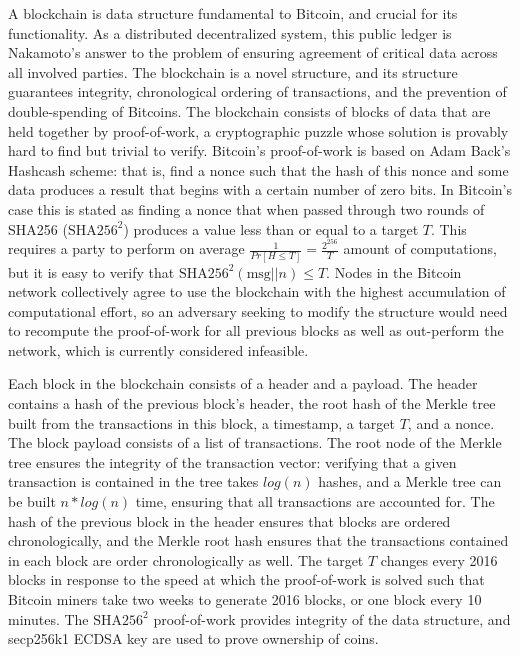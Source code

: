 A blockchain is data structure fundamental to Bitcoin, and crucial for its functionality. As a distributed decentralized system, this public ledger is Nakamoto's answer to the problem of ensuring agreement of critical data across all involved parties. The blockchain is a novel structure, and its structure guarantees integrity, chronological ordering of transactions, and the prevention of double-spending of Bitcoins. The blockchain consists of blocks of data that are held together by proof-of-work, a cryptographic puzzle whose solution is provably hard to find but trivial to verify. Bitcoin's proof-of-work is based on Adam Back's Hashcash scheme: that is, find a nonce such that the hash of this nonce and some data produces a result that begins with a certain number of zero bits. In Bitcoin's case this is stated as finding a nonce that when passed through two rounds of SHA256 ($ \textrm{SHA}256^{{2}} $) produces a value less than or equal to a target $ T $. This requires a party to perform on average $ \frac{1}{Pr[H \leq T]} = \frac{2 ^ {{256}}}{T} $ amount of computations, but it is easy to verify that $ \textrm{SHA}256^{{2}}(\textrm{msg} || n) \leq T $. Nodes in the Bitcoin network collectively agree to use the blockchain with the highest accumulation of computational effort, so an adversary seeking to modify the structure would need to recompute the proof-of-work for all previous blocks as well as out-perform the network, which is currently considered infeasible.\cite{Okupski2014}

Each block in the blockchain consists of a header and a payload. The header contains a hash of the previous block's header, the root hash of the Merkle tree built from the transactions in this block, a timestamp, a target $ T $, and a nonce. The block payload consists of a list of transactions. The root node of the Merkle tree ensures the integrity of the transaction vector: verifying that a given transaction is contained in the tree takes $ log(n) $ hashes, and a Merkle tree can be built $ n * log(n) $ time, ensuring that all transactions are accounted for. The hash of the previous block in the header ensures that blocks are ordered chronologically, and the Merkle root hash ensures that the transactions contained in each block are order chronologically as well. The target $ T $ changes every 2016 blocks in response to the speed at which the proof-of-work is solved such that Bitcoin miners take two weeks to generate 2016 blocks, or one block every 10 minutes. The $ \textrm{SHA}256^{{2}} $ proof-of-work provides integrity of the data structure, and secp256k1 ECDSA key are used to prove ownership of coins.\cite{Okupski2014}

